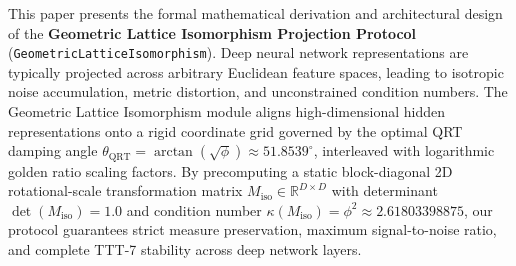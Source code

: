 \begin{abstractbox}
This paper presents the formal mathematical derivation and architectural design of the \textbf{Geometric Lattice Isomorphism Projection Protocol} (\texttt{GeometricLatticeIsomorphism}). Deep neural network representations are typically projected across arbitrary Euclidean feature spaces, leading to isotropic noise accumulation, metric distortion, and unconstrained condition numbers. The Geometric Lattice Isomorphism module aligns high-dimensional hidden representations onto a rigid coordinate grid governed by the optimal QRT damping angle $\theta_{\text{QRT}} = \arctan(\sqrt{\phi}) \approx 51.8539^\circ$, interleaved with logarithmic golden ratio scaling factors. By precomputing a static block-diagonal 2D rotational-scale transformation matrix $M_{\text{iso}} \in \mathbb{R}^{D \times D}$ with determinant $\det(M_{\text{iso}}) = 1.0$ and condition number $\kappa(M_{\text{iso}}) = \phi^2 \approx 2.61803398875$, our protocol guarantees strict measure preservation, maximum signal-to-noise ratio, and complete TTT-7 stability across deep network layers.
\end{abstractbox}

